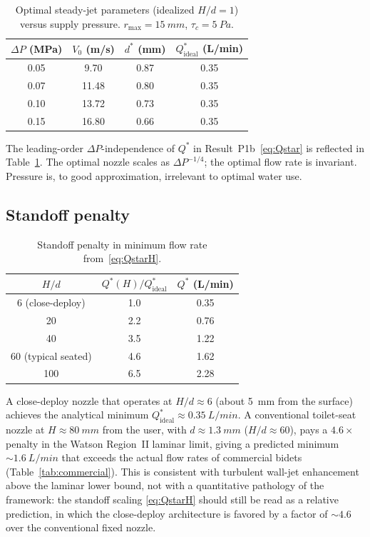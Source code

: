 \documentclass[aps,prfluids,reprint,amsmath,amssymb,floatfix]{revtex4-2}
\begin{document}
\begin{table}[h]
\centering
\caption{Optimal steady-jet parameters (idealized $H/d = 1$) versus
supply pressure. $r_\mathrm{max} = \SI{15}{mm}$, $\tau_c = \SI{5}{Pa}$.}
\label{tab:pressure}
\begin{tabular}{cccc}
\toprule
$\Delta P$ (MPa) & $V_0$ (m/s) & $d^*$ (mm) & $Q^*_\mathrm{ideal}$ (L/min) \\
\midrule
0.05 & 9.70  & 0.87 & 0.35 \\
0.07 & 11.48 & 0.80 & 0.35 \\
0.10 & 13.72 & 0.73 & 0.35 \\
0.15 & 16.80 & 0.66 & 0.35 \\
\bottomrule
\end{tabular}
\end{table}

The leading-order $\Delta P$-independence of $Q^*$ in
Result~P1b~\eqref{eq:Qstar} is reflected in Table~\ref{tab:pressure}.
The optimal nozzle scales as $\Delta P^{-1/4}$; the optimal flow rate
is invariant. Pressure is, to good approximation, irrelevant to optimal
water use.

\subsection{Standoff penalty}

\begin{table}[h]
\centering
\caption{Standoff penalty in minimum flow rate from~\eqref{eq:QstarH}.}
\label{tab:standoff}
\begin{tabular}{ccc}
\toprule
$H/d$ & $Q^*(H)/Q^*_\mathrm{ideal}$ & $Q^*$ (L/min) \\
\midrule
6 (close-deploy) & 1.0 & 0.35 \\
20 & 2.2 & 0.76 \\
40 & 3.5 & 1.22 \\
60 (typical seated) & 4.6 & 1.62 \\
100 & 6.5 & 2.28 \\
\bottomrule
\end{tabular}
\end{table}

A close-deploy nozzle that operates at $H/d \approx 6$ (about
\SI{5}{mm} from the surface) achieves the analytical minimum
$Q^*_\mathrm{ideal} \approx \SI{0.35}{L/min}$. A conventional
toilet-seat nozzle at $H \approx \SI{80}{mm}$ from the user, with
$d \approx \SI{1.3}{mm}$ ($H/d \approx 60$), pays a $4.6\times$ penalty
in the Watson Region~II laminar limit, giving a predicted minimum
$\sim\!\SI{1.6}{L/min}$ that exceeds the actual flow rates of
commercial bidets (Table~\ref{tab:commercial}). This is consistent
with turbulent wall-jet enhancement above the laminar lower bound,
not with a quantitative pathology of the framework: the standoff
scaling \eqref{eq:QstarH} should still be read as a relative
prediction, in which the close-deploy architecture is
favored by a factor of $\sim 4.6$ over the conventional fixed
nozzle.
\end{document}
